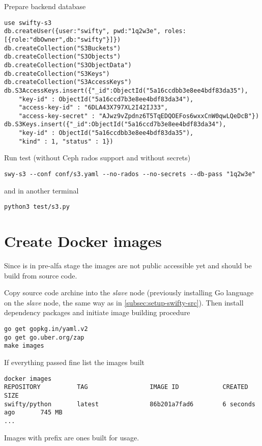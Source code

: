 Prepare backend database

\begin{lstlisting}
use swifty-s3
db.createUser({user:"swifty", pwd:"1q2w3e", roles:[{role:"dbOwner",db:"swifty"}]})
db.createCollection("S3Buckets")
db.createCollection("S3Objects")
db.createCollection("S3ObjectData")
db.createCollection("S3Keys")
db.createCollection("S3AccessKeys")
db.S3AccessKeys.insert({"_id":ObjectId("5a16ccdbb3e8ee4bdf83da35"),
	"key-id" : ObjectId("5a16ccd7b3e8ee4bdf83da34"),
	"access-key-id" : "6DLA43X797XL2I42IJ33",
	"access-key-secret" : "AJwz9vZpdnz6T5TqEDQOEFos6wxxCnW0qwLQeDcB"})
db.S3Keys.insert({"_id":ObjectId("5a16ccd7b3e8ee4bdf83da34"),
	"key-id" : ObjectId("5a16ccdbb3e8ee4bdf83da35"),
	"kind" : 1, "status" : 1})
\end{lstlisting}

Run test (without Ceph rados support and without secrets)

\begin{lstlisting}
swy-s3 --conf conf/s3.yaml --no-rados --no-secrets --db-pass "1q2w3e"
\end{lstlisting}

and in another terminal

\begin{lstlisting}
python3 test/s3.py
\end{lstlisting}

\section{Create Docker images}
\label{sec:setup-images}

Since  is in pre-alfa stage the images are not public
accessible yet and should be build from  source code.

Copy source code archine into the \emph{slave} node (previously
installing Go language on the \emph{slave} node, the same way
as in \ref{subsec:setup-swifty-src}). Then install dependency packages
and initiate image building procedure

\begin{lstlisting}
go get gopkg.in/yaml.v2
go get go.uber.org/zap
make images
\end{lstlisting}

If everything passed fine list the images built

\begin{lstlisting}
docker images
REPOSITORY          TAG                 IMAGE ID            CREATED             SIZE
swifty/python       latest              86b201a7fad6        6 seconds ago       745 MB
...
\end{lstlisting}

Images with  prefix are ones built for  usage.
